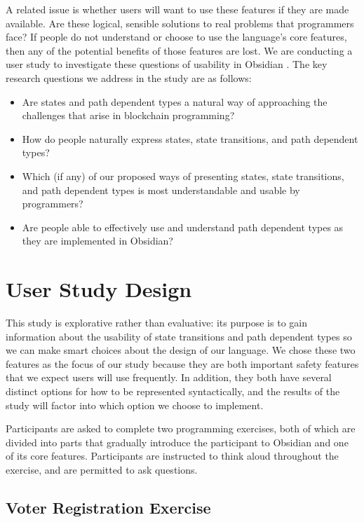 \documentclass[sigplan,10pt,review]{acmart}\settopmatter{printfolios=true}
\begin{document}
	A related issue is whether users will want to use these features if they are made available. Are 
these logical, sensible solutions to real problems that programmers face? If people do not 
understand or choose to use the language's core features, then any of the potential benefits 
of those features are lost. 
	We are conducting a user study to investigate these questions of usability in Obsidian \cite{Myers}. The 
key research questions we address in the study are as follows: 
\begin{itemize}
\item Are states and path dependent types a natural way of 
	approaching the challenges that arise in blockchain programming?
\item How do people naturally express states, state transitions, and path dependent types?
\item Which (if any) of our proposed ways of presenting states, state transitions, and path dependent types
	is most understandable and usable by programmers?
\item Are people able to effectively use and understand path dependent types as they
are implemented in Obsidian?
\end{itemize}

\section{User Study Design}
	
This study is explorative rather than evaluative: its purpose is to gain information about the usability of state transitions 
and path dependent types so we can make smart choices about the design of our language. 
We chose these two features as the focus of our study because they are both important safety features 
that we expect users will use frequently. In addition, they both have several distinct options for how to be 
represented syntactically, and the results of the study will factor into which option we choose to implement.  

Participants are asked to complete two programming exercises, both of which are divided into parts that 
gradually introduce the participant to Obsidian and one of its core features. 
Participants are instructed to think aloud throughout the exercise, and are permitted to ask questions.

\subsection{Voter Registration Exercise}
\end{document}
